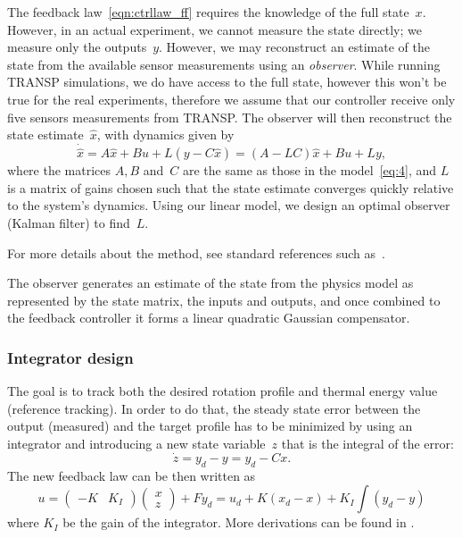 \documentclass[12pt,lot, lof]{puthesis}
\begin{document}
The feedback law~\eqref{eqn:ctrllaw_ff} requires the knowledge of the full state~$x$.  However, in an actual experiment, we cannot measure the state directly; we measure only the outputs~$y$.  However, we may reconstruct an estimate of the state from the available sensor measurements using an {\em observer}.
While running TRANSP simulations, we do have access to the full state, however this won't be true for the real experiments, therefore we assume that our controller receive only five sensors measurements from TRANSP. The observer will then reconstruct the state estimate~$\hat x$, with dynamics given by
\begin{equation}
		\dot{\hat{x}} =  A \hat{x} + B u + L (y - C \hat{x}) 
			= (A- L C) \hat{x} + B u + L y,
		\label{obs}
\end{equation}
where the matrices $A,B$ and~$C$ are the same as those in the model~\eqref{eq:4}, and $L$ is a matrix of gains chosen such that the state estimate converges quickly relative to the system's dynamics.
Using our linear model, we design an optimal observer (Kalman filter) to find~$L$.

For more details about the method, see standard references such as~\cite{SandP, AandM}.

The observer generates an estimate of the state from the physics model as represented by the state matrix, the inputs and outputs, and once combined to the feedback controller it forms a linear quadratic Gaussian compensator.

\subsubsection{Integrator design} 

The goal is to track both the desired rotation profile and thermal energy value (reference tracking). In order to do that, the steady state error between the output (measured) and the target profile has to be minimized by using an integrator and introducing a new state variable~$z$ that is the integral of the error:
\begin{equation}
	\dot{z} = y_{d} - y = y_{d} - C x.
	\label{integral}
\end{equation}
The new feedback law can be then written as
\begin{equation}
u = \left(\! \begin{array}{cc}  -K & K_I\end{array}\!\right) \left(\! \begin{array}{c}  x \\ z \end{array}\!\right) + F y_{d} 
   = u_d + K (x_d - x) + K_I \!\!\int (y_d - y)
\end{equation}
where $K_I$ be the gain of the integrator. More derivations can be found in \cite{Goumiri15}.
\end{document}
